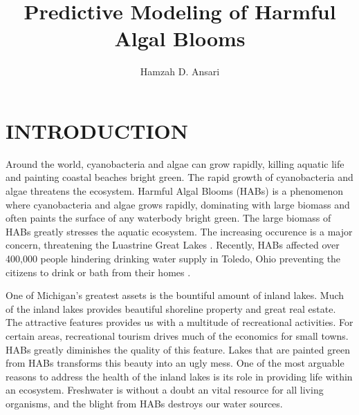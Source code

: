 \documentclass{ou-thesis}
\begin{document}
\graphicspath{{./figures/}}
\title{Predictive Modeling of Harmful Algal Blooms}
\author{Hamzah D. Ansari}
\dedication{I dedicate my thesis to my best friends and my beloved family for providing me love and support through my graduate program. I also dedicate this thesis to Carl Sagan who instill my curiosity and pursuit of scienctific knowledge.}

\makefrontmatter


\renewcommand{\bibname}{REFERENCES}

\chapter{INTRODUCTION}
  \setlength{\parindent}{.5 in}
   \raggedright\setlength{\parindent}{.5 in}

Around the world, cyanobacteria and algae can grow rapidly, killing aquatic life and painting coastal beaches bright green. The rapid growth of cyanobacteria and algae threatens the ecosystem. Harmful Algal Blooms (HABs) is a phenomenon where cyanobacteria and algae grows rapidly, dominating with large biomass and often paints the surface of any waterbody bright green. The large biomass of HABs greatly stresses the aquatic ecosystem. The increasing occurence is a major concern, threatening the Luastrine Great Lakes \cite{raikow_dominance_2004}. Recently, HABs affected over 400,000 people hindering drinking water supply in Toledo, Ohio preventing the citizens to drink or bath from their homes \cite{mann_toledo_2014}.


One of Michigan's greatest assets is the bountiful amount of inland lakes. Much of the inland lakes provides beautiful shoreline property and great real estate. The attractive features provides us with a multitude of recreational activities. For certain areas, recreational tourism drives much of the economics for small towns. HABs greatly diminishes the quality of this feature. Lakes that are painted green from HABs transforms this beauty into an ugly mess. One of the most arguable reasons to address the health of the inland lakes is its role in providing life within an ecosystem.  Freshwater is without a doubt an vital resource for all living organisms, and the blight from HABs destroys our water sources.
\end{document}
